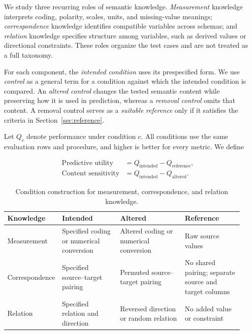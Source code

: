 \documentclass{article} %
\begin{document}
We study three recurring roles of semantic knowledge.
\emph{Measurement} knowledge interprets coding, polarity, scales, units, and missing-value meanings;
\emph{correspondence} knowledge identifies compatible variables across schemas;
and \emph{relation} knowledge specifies structure among variables, such as derived values or directional constraints.
These roles organize the test cases and are not treated as a full taxonomy.

For each component, the \emph{intended condition} uses its prespecified form.
We use \emph{control} as a general term for a condition against which the intended condition is compared.
An \emph{altered control} changes the tested semantic content while preserving how it is used in prediction, whereas a \emph{removal control} omits that content.
A removal control serves as a \emph{suitable reference} only if it satisfies the criteria in Section~\ref{sec:reference}.

Let $Q_c$ denote performance under condition $c$.
All conditions use the same evaluation rows and procedure, and higher is better for every metric.
We define

\begin{align}
\text{Predictive utility}
    &= Q_{\mathrm{intended}} - Q_{\mathrm{reference}},\\
\text{Content sensitivity}
    &= Q_{\mathrm{intended}} - Q_{\mathrm{altered}}.
\end{align}

\begin{table}[h]
\caption{Condition construction for measurement, correspondence, and relation knowledge.}
\label{tab:knowledge_conditions}
\centering
\fontsize{8pt}{9pt}\selectfont
\setlength{\tabcolsep}{3pt}
\renewcommand{\arraystretch}{0.92}

\begin{tabular}{@{}P{0.16\linewidth}P{0.25\linewidth}P{0.29\linewidth}P{0.25\linewidth}@{}}
\toprule
Knowledge & Intended & Altered & Reference \\
\midrule

Measurement &
Specified coding or numerical conversion &
Altered coding or numerical conversion &
Raw source values \\

Correspondence &
Specified source--target pairing &
Permuted source--target pairing &
No shared pairing; separate source and target columns \\

Relation &
Specified relation and direction &
Reversed direction or random relation &
No added value or constraint \\

\bottomrule
\end{tabular}
\end{table}
\end{document}
